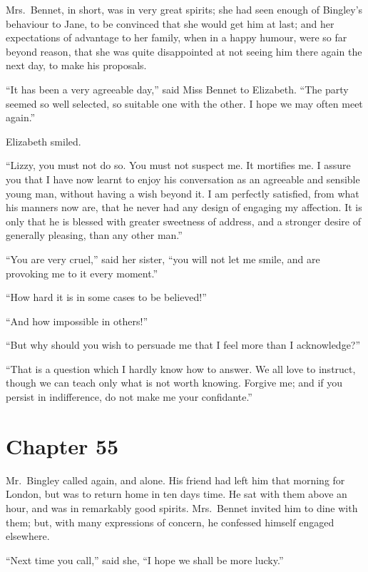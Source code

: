 Mrs.\ Bennet, in short, was in very great spirits; she had seen
enough of Bingley's behaviour to Jane, to be convinced that she
would get him at last; and her expectations of advantage to her
family, when in a happy humour, were so far beyond reason, that
she was quite disappointed at not seeing him there again the
next day, to make his proposals.

``It has been a very agreeable day,'' said Miss Bennet to
Elizabeth.  ``The party seemed so well selected, so suitable
one with the other.  I hope we may often meet again.''

Elizabeth smiled.

``Lizzy, you must not do so.  You must not suspect me.  It
mortifies me.  I assure you that I have now learnt to enjoy
his conversation as an agreeable and sensible young man,
without having a wish beyond it.  I am perfectly satisfied,
from what his manners now are, that he never had any design
of engaging my affection.  It is only that he is blessed
with greater sweetness of address, and a stronger desire of
generally pleasing, than any other man.''

``You are very cruel,'' said her sister, ``you will not let me
smile, and are provoking me to it every moment.''

``How hard it is in some cases to be believed!''

``And how impossible in others!''

``But why should you wish to persuade me that I feel more than I
acknowledge?''

``That is a question which I hardly know how to answer.  We all
love to instruct, though we can teach only what is not worth
knowing.  Forgive me; and if you persist in indifference, do
not make me your confidante.''



\chapter{Chapter 55}


 Mr.\ Bingley called again, and
alone.  His friend had left him that morning for London, but
was to return home in ten days time.  He sat with them above an
hour, and was in remarkably good spirits.  Mrs.\ Bennet invited
him to dine with them; but, with many expressions of concern,
he confessed himself engaged elsewhere.

``Next time you call,'' said she, ``I hope we shall be more
lucky.''

